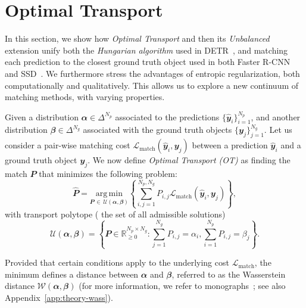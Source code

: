 \section{Optimal Transport}
In this section, we show how \emph{Optimal Transport} and then its \emph{Unbalanced} extension unify both the \emph{Hungarian algorithm} used in DETR~\cite{carion2020detr}, and matching each prediction to the closest ground truth object used in both Faster R-CNN~\cite{ren2015fasterrcnn} and SSD~\cite{liu2016ssd}. We furthermore stress the advantages of entropic regularization, both computationally and qualitatively. This allows us to explore a new continuum of matching methods, with varying properties.

\begin{definition}
\label{def:OT}
    Given a distribution $\mathbfit{\alpha} \in \Delta^{N_p}$ associated to the predictions $\{\hat{\mathbfit{y}}_i\}_{i=1}^{N_p}$, and another distribution $\mathbfit{\beta} \in \Delta^{N_g}$ associated with the ground truth  objects $\{\mathbfit{y}_j\}_{j=1}^{N_g}$. Let us consider a pair-wise matching cost $\mathcal{L}_{\text{match}}(\hat{\mathbfit{y}}_i,\mathbfit{y}_j)$ between a prediction $\hat{\mathbfit{y}}_i$ and a ground truth object $\mathbfit{y}_j$. We now define \emph{Optimal Transport (OT)} as finding the match $\mathbfit{P}$ that minimizes the following problem:
    \begin{equation}
        \hat{\mathbfit{P}} = \underset{\mathbfit{P} \,\in\, \mathcal{U}(\mathbfit{\alpha},\mathbfit{\beta})}{\mathrm{arg\,min}} \left\{\sum_{i,j=1}^{N_p,N_g} P_{i,j}\mathcal{L}_{\text{match}}\left(\hat{\mathbfit{y}}_i, \mathbfit{y}_j \right)\right\},
    \end{equation}
    with transport polytope ( the set of all admissible solutions) 
    \begin{equation}
        \mathcal{U}(\mathbfit{\alpha},\mathbfit{\beta}) = \left\{ \mathbfit{P} \in \mathbb{R}_{\geq 0}^{N_p \times N_g} : \sum_{j=1}^{N_g} P_{i,j} = \alpha_i ,\sum_{i=1}^{N_p} P_{i,j} = \beta_j\right\}.
    \end{equation}
\end{definition}
Provided that certain conditions apply to the underlying cost $\mathcal{L}_{\text{match}}$, the minimum defines a distance between $\mathbfit{\alpha}$ and $\mathbfit{\beta}$, referred to as the Wasserstein distance $\mathcal{W}(\mathbfit{\alpha},\mathbfit{\beta})$ (for more information, we refer to monographs~\cite{villani2009optimal,santambrogio,peyre2019computational}; see also Appendix~\ref{app:theory-wass}).

